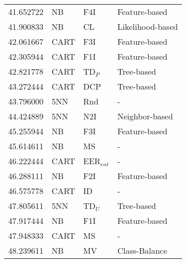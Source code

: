 \begin{tabular}{rlll}
41.652722 & NB & F4I & Feature-based \\
41.900833 & NB & CL & Likelihood-based \\
42.061667 & CART & F3I & Feature-based \\
42.305944 & CART & F1I & Feature-based \\
42.821778 & CART & TD$_P$ & Tree-based \\
43.272444 & CART & DCP & Tree-based \\
43.796000 & 5NN & Rnd & - \\
44.424889 & 5NN & N2I & Neighbor-based \\
45.255944 & NB & F3I & Feature-based \\
45.614611 & NB & MS & - \\
46.222444 & CART & EER$_{ent}$ & - \\
46.288111 & NB & F2I & Feature-based \\
46.575778 & CART & ID & - \\
47.805611 & 5NN & TD$_U$ & Tree-based \\
47.917444 & NB & F1I & Feature-based \\
47.948333 & CART & MS & - \\
48.239611 & NB & MV & Class-Balance \\
\bottomrule
\end{tabular}
